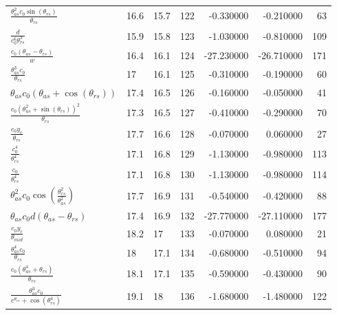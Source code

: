 \begin{tabularx}{\textwidth}{lllrrrr}
$ \displaystyle\frac{\theta_{as}^{2} c_{0} \sin{\left(\theta_{rs} \right)}}{\theta_{rs}} $  &  16.6  &  15.7  &  122  &  -0.330000  &  -0.210000  &  63  \\ 
$ \displaystyle\frac{d}{c_{0}^{6} \theta_{rs}^{3}} $  &  15.9  &  15.8  &  123  &  -1.030000  &  -0.810000  &  109  \\ 
$ \displaystyle\frac{c_{0} \left(\theta_{as} - \theta_{rs}\right)}{w} $  &  16.4  &  16.1  &  124  &  -27.230000  &  -26.710000  &  171  \\ 
$ \displaystyle\frac{\theta_{as}^{3} c_{0}}{\theta_{rs}} $  &  17\phantom{.0}  &  16.1  &  125  &  -0.310000  &  -0.190000  &  60  \\ 
$ \theta_{as} c_{0} \left(\theta_{as} + \cos{\left(\theta_{rs} \right)}\right) $  &  17.4  &  16.5  &  126  &  -0.160000  &  -0.050000  &  41  \\ 
$ \displaystyle\frac{c_{0} \left(\theta_{as}^{2} + \sin{\left(\theta_{rs} \right)}\right)^{2}}{\theta_{rs}} $  &  17.3  &  16.5  &  127  &  -0.410000  &  -0.290000  &  70  \\ 
$ \displaystyle\frac{c_{0} y_c}{\theta_{rs}} $  &  17.7  &  16.6  &  128  &  -0.070000  &  0.060000  &  27  \\ 
$ \displaystyle\frac{c_{0}^{4}}{\theta_{rs}^{4}} $  &  17.1  &  16.8  &  129  &  -1.130000  &  -0.980000  &  113  \\ 
$ \displaystyle\frac{c_{0}}{\theta_{rs}^{4}} $  &  17.1  &  16.8  &  130  &  -1.130000  &  -0.980000  &  114  \\ 
$ \theta_{as}^{2} c_{0} \cos{\left(\displaystyle\frac{\theta_{rs}^{2}}{\theta_{as}^{2}} \right)} $  &  17.7  &  16.9  &  131  &  -0.540000  &  -0.420000  &  88  \\ 
$ \theta_{as} c_{0} d \left(\theta_{as} - \theta_{rs}\right) $  &  17.4  &  16.9  &  132  &  -27.770000  &  -27.110000  &  177  \\ 
$ \displaystyle\frac{c_{0} y_c}{\theta_{mid}} $  &  18.2  &  17\phantom{.0}  &  133  &  -0.070000  &  0.080000  &  21  \\ 
$ \displaystyle\frac{\theta_{as}^{4} c_{0}}{\theta_{rs}} $  &  18\phantom{.0}  &  17.1  &  134  &  -0.680000  &  -0.510000  &  94  \\ 
$ \displaystyle\frac{c_{0} \left(\theta_{as}^{4} + \theta_{rs}\right)}{\theta_{rs}} $  &  18.1  &  17.1  &  135  &  -0.590000  &  -0.430000  &  90  \\ 
$ \displaystyle\frac{\theta_{as}^{3} c_{0}}{e^{\theta_{rs}} + \cos{\left(\theta_{rs}^{4} \right)}} $  &  19.1  &  18\phantom{.0}  &  136  &  -1.680000  &  -1.480000  &  122  \\ 

\end{tabularx}
